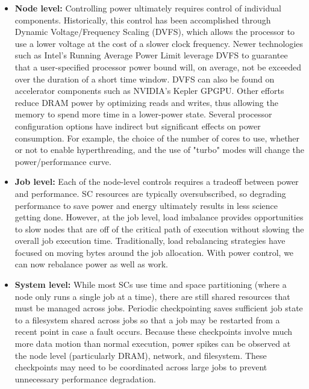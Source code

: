 \begin{itemize}
\item \textbf{Node level:} Controlling power ultimately requires control of individual
components. Historically, this control has been accomplished through Dynamic Voltage/Frequency
Scaling (DVFS), which allows the processor to use a lower voltage at the cost of a slower
clock frequency. Newer technologies such as Intel's Running Average Power Limit leverage
DVFS to guarantee that a user-specified processor power bound will, on average, not be exceeded 
over the duration of a short time window. DVFS can also be found on accelerator components such
as NVIDIA's Kepler GPGPU. Other efforts reduce DRAM power by optimizing reads and writes, thus
allowing the memory to spend more time in a lower-power state. Several processor configuration
options have indirect but significant effects on power consumption. For example, the choice
of the number of cores to use, whether or not to enable hyperthreading, and the use of 
"turbo" modes will change the power/performance curve.

\item \textbf{Job level:} Each of the node-level controls requires a tradeoff between
power and performance. SC resources are typically oversubscribed, so degrading performance
to save power and energy ultimately results in less science getting done. However, at the 
job level, load imbalance provides opportunities to slow nodes that are off of the critical
path of execution without slowing the overall job execution time. Traditionally, load 
rebalancing strategies have focused on moving bytes around the job allocation. With 
power control, we can now rebalance power as well as work.

\item \textbf{System level:} While most SCs use time and space partitioning (where a node
only runs a single job at a time), there are still shared resources that must be managed
across jobs. Periodic checkpointing saves sufficient job state to a filesystem shared 
across jobs so that a job may be restarted from a recent point in case a fault occurs.
Because these checkpoints involve much more data motion than normal execution, power 
spikes can be observed at the node level (particularly DRAM), network, and filesystem.
These checkpoints may need to be coordinated across large jobs to prevent unnecessary
performance degradation.


\end{itemize}
